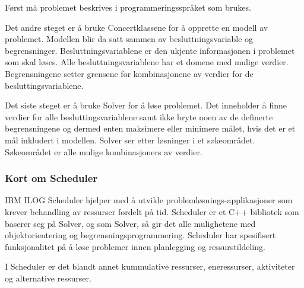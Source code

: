 Først må problemet beskrives i programmeringsspråket som brukes.

Det andre steget er å bruke Concertklassene for å opprette en modell av problemet. Modellen blir da satt sammen av besluttningsvariable og begrensninger. Besluttningsvariablene er den ukjente informasjonen i problemet som skal løses. Alle besluttningsvariablene har et domene med mulige verdier. Begrensningene setter grensene for kombinasjonene av verdier for de besluttingsvariablene.

Det siste steget er å bruke Solver for å løse problemet. Det inneholder å finne verdier for alle besluttingsvariablene samt ikke bryte noen av de definerte begrensningene og dermed enten maksimere eller minimere målet, hvis det er et mål inkludert i modellen. Solver ser etter løsninger i et søkeområdet. Søkeområdet er alle mulige kombinasjoners av verdier.\cite{cpsolverilog}

\subsubsection{Kort om Scheduler}\cite{cpschedulerilog}
IBM ILOG Scheduler hjelper med å utvikle problemløsnings-applikasjoner som krever behandling av ressurser fordelt på tid. Scheduler er et C++ bibliotek som baserer seg på Solver, og som Solver, så gir det alle mulighetene med objektorientering og begrensningsprogrammering. Scheduler har spesifisert funksjonalitet på å løse problemer innen planlegging og ressurstildeling.

I Scheduler er det blandt annet kummulative ressurser, eneressurser, aktiviteter og alternative ressurser.